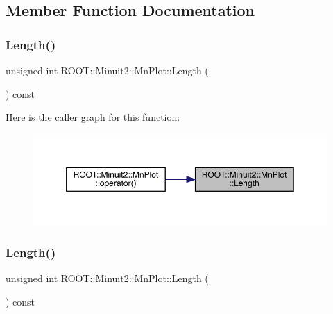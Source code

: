 \subsection{Member Function Documentation}
\mbox{\label{classROOT_1_1Minuit2_1_1MnPlot_aefbe338659ecdac9b7ad160472a34221}} 
\subsubsection{\texorpdfstring{Length()}{Length()}\hspace{0.1cm}{\footnotesize\ttfamily [1/3]}}
{\footnotesize\ttfamily unsigned int R\+O\+O\+T\+::\+Minuit2\+::\+Mn\+Plot\+::\+Length (\begin{DoxyParamCaption}{ }\end{DoxyParamCaption}) const\hspace{0.3cm}{\ttfamily [inline]}}

Here is the caller graph for this function\+:
\nopagebreak
\begin{figure}[H]
\begin{center}
\leavevmode
\includegraphics[width=350pt]{d1/d62/classROOT_1_1Minuit2_1_1MnPlot_aefbe338659ecdac9b7ad160472a34221_icgraph}
\end{center}
\end{figure}
\mbox{\label{classROOT_1_1Minuit2_1_1MnPlot_aefbe338659ecdac9b7ad160472a34221}} 
\subsubsection{\texorpdfstring{Length()}{Length()}\hspace{0.1cm}{\footnotesize\ttfamily [2/3]}}
{\footnotesize\ttfamily unsigned int R\+O\+O\+T\+::\+Minuit2\+::\+Mn\+Plot\+::\+Length (\begin{DoxyParamCaption}{ }\end{DoxyParamCaption}) const\hspace{0.3cm}{\ttfamily [inline]}}

